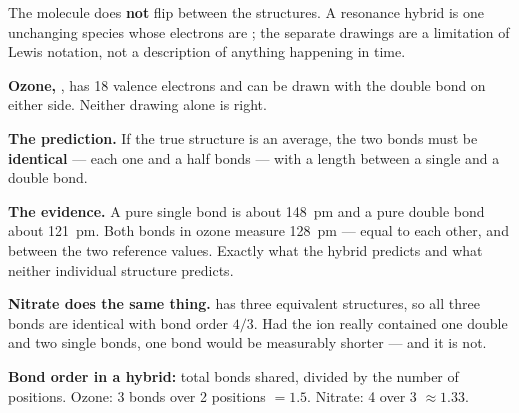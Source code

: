 \documentclass{apchem-worksheet}
\begin{document}
\begin{center}
\end{center}

\begin{apctrap}
The molecule does \textbf{not} flip between the structures. A resonance
hybrid is one unchanging species whose electrons are
; the separate drawings are a limitation of Lewis
notation, not a description of anything happening in time.
\end{apctrap}

\begin{workedexample}
\textbf{Ozone, }, has 18 valence electrons and can be drawn with
the double bond on either side. Neither drawing alone is right.

\textbf{The prediction.} If the true structure is an average, the two
 bonds must be \textbf{identical} --- each one and a half bonds
--- with a length between a single and a double bond.

\textbf{The evidence.} A pure  single bond is about
\SI{148}{\pico\meter} and a pure  double bond about
\SI{121}{\pico\meter}. Both bonds in ozone measure
\SI{128}{\pico\meter} --- equal to each other, and between the two
reference values. Exactly what the hybrid predicts and what neither
individual structure predicts.

\textbf{Nitrate does the same thing.}  has three equivalent
structures, so all three  bonds are identical with bond order
$4/3$. Had the ion really contained one double and two single bonds, one
bond would be measurably shorter --- and it is not.

\textbf{Bond order in a hybrid:} total bonds shared, divided by the
number of positions. Ozone: 3 bonds over 2 positions $= 1.5$. Nitrate:
4 over 3 $\approx 1.33$.
\end{workedexample}
\end{document}
